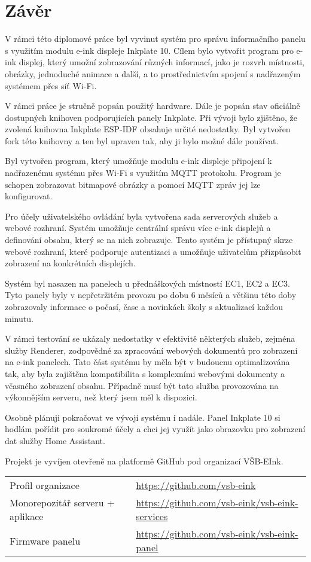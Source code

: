 \chapter{Závěr}

V rámci této diplomové práce byl vyvinut systém pro správu informačního panelu s využitím modulu e-ink displeje Inkplate 10. Cílem bylo vytvořit program pro e-ink displej, který umožní zobrazování různých informací, jako je rozvrh místnosti, obrázky, jednoduché animace a další, a to prostřednictvím spojení s nadřazeným systémem přes síť Wi-Fi.

V rámci práce je stručně popsán použitý hardware. Dále je popsán stav oficiálně dostupných knihoven podporujících panely Inkplate. Při vývoji bylo zjištěno, že zvolená knihovna Inkplate ESP-IDF obsahuje určité nedostatky. Byl vytvořen fork této knihovny a ten byl upraven tak, aby ji bylo možné dále používat.

Byl vytvořen program, který umožňuje modulu e-ink displeje připojení k nadřazenému systému přes Wi-Fi s využitím MQTT protokolu. Program je schopen zobrazovat bitmapové obrázky a pomocí MQTT zpráv jej lze konfigurovat.

Pro účely uživatelského ovládání byla vytvořena sada serverových služeb a webové rozhraní. Systém umožňuje centrální správu více e-ink displejů a definování obsahu, který se na nich zobrazuje. Tento systém je přístupný skrze webové rozhraní, které podporuje autentizaci a umožňuje uživatelům přizpůsobit zobrazení na konkrétních displejích.

Systém byl nasazen na panelech u přednáškových místností EC1, EC2 a EC3. Tyto panely byly v nepřetržitém provozu po dobu 6 měsíců a většinu této doby zobrazovaly informace o počasí, čase a novinkách školy s aktualizací každou minutu.

V rámci testování se ukázaly nedostatky v efektivitě některých služeb, zejména služby Renderer, zodpovědné za zpracování webových dokumentů pro zobrazení na e-ink panelech. Tato část systému by měla být v budoucnu optimalizována tak, aby byla zajištěna kompatibilita s komplexními webovými dokumenty a včasného zobrazení obsahu. Případně musí být tato služba provozována na výkonnějším serveru, než který jsem měl k dispozici.

Osobně plánuji pokračovat ve vývoji systému i nadále. Panel Inkplate 10 si hodlám pořídit pro soukromé účely a chci jej využít jako obrazovku pro zobrazení dat služby Home Assistant\cite{HomeassistantCoreHouse_with_garden}.

\newpage
Projekt je vyvíjen otevřeně na platformě GitHub pod organizací VŠB-EInk.
\begin{table}[h]
    \begin{tabular}{ll}
        Profil organizace & \url{https://github.com/vsb-eink} \\
        Monorepozitář serveru + aplikace & \url{https://github.com/vsb-eink/vsb-eink-services} \\
        Firmware panelu & \url{https://github.com/vsb-eink/vsb-eink-panel} \\
    \end{tabular}
\end{table}